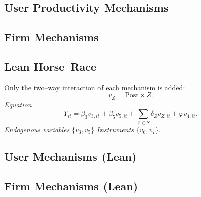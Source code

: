\documentclass{article}
\newcommand{\cleanedresultsdir}{../results/cleaned}
\begin{document}
\clearpage
\begin{landscape}
\subsection{User Productivity Mechanisms}

\end{landscape}

\clearpage
\begin{landscape}
\subsection{Firm Mechanisms}

\end{landscape}


\clearpage
\subsection*{Lean Horse–Race}
Only the two–way interaction of each mechanism is added:
\[v_Z = \text{Post}\!\times\! Z.\]
\emph{Equation}
\[Y_{it}=\beta_3 v_{3,it}+\beta_5 v_{5,it}+\sum_{Z\in S}\delta_Z v_{Z,it}+\varphi v_{4,it}.
\]
\emph{Endogenous variables}\; $\{v_3,v_5\}$ \quad\emph{Instruments}\; $\{v_6,v_7\}$.


\clearpage
\begin{landscape}
\subsection{User Mechanisms (Lean)}

\end{landscape}

\clearpage
\begin{landscape}
\subsection{Firm Mechanisms (Lean)}

\end{landscape}
\end{document}
